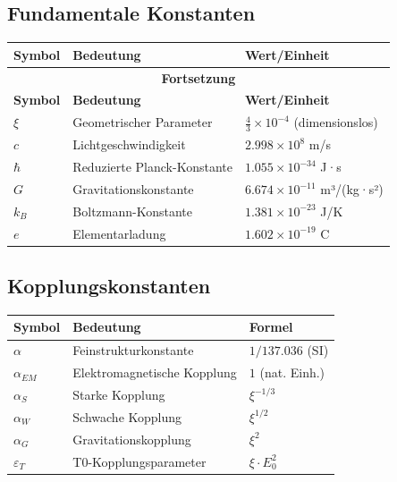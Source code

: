 \subsection{Fundamentale Konstanten}
\begin{longtable}{lll}
	\toprule
	\textbf{Symbol} & \textbf{Bedeutung} & \textbf{Wert/Einheit} \\
	\midrule
	\endfirsthead
	\multicolumn{3}{c}{{\bfseries Fortsetzung}} \\
	\toprule
	\textbf{Symbol} & \textbf{Bedeutung} & \textbf{Wert/Einheit} \\
	\midrule
	\endhead
	\bottomrule
	\endfoot
	\bottomrule
	\endlastfoot
	
	$\xi$ & Geometrischer Parameter & $\frac{4}{3} \times 10^{-4}$ (dimensionslos) \\
	$c$ & Lichtgeschwindigkeit & $2.998 \times 10^8$ m/s \\
	$\hbar$ & Reduzierte Planck-Konstante & $1.055 \times 10^{-34}$ J·s \\
	$G$ & Gravitationskonstante & $6.674 \times 10^{-11}$ m³/(kg·s²) \\
	$k_B$ & Boltzmann-Konstante & $1.381 \times 10^{-23}$ J/K \\
	$e$ & Elementarladung & $1.602 \times 10^{-19}$ C \\
\end{longtable}

\subsection{Kopplungskonstanten}
\begin{longtable}{lll}
	\toprule
	\textbf{Symbol} & \textbf{Bedeutung} & \textbf{Formel} \\
	\midrule
	$\alpha$ & Feinstrukturkonstante & $1/137.036$ (SI) \\
	$\alpha_{EM}$ & Elektromagnetische Kopplung & $1$ (nat. Einh.) \\
	$\alpha_S$ & Starke Kopplung & $\xi^{-1/3}$ \\
	$\alpha_W$ & Schwache Kopplung & $\xi^{1/2}$ \\
	$\alpha_G$ & Gravitationskopplung & $\xi^{2}$ \\
	$\varepsilon_T$ & T0-Kopplungsparameter & $\xi \cdot E_0^2$ \\
	\bottomrule
\end{longtable}


